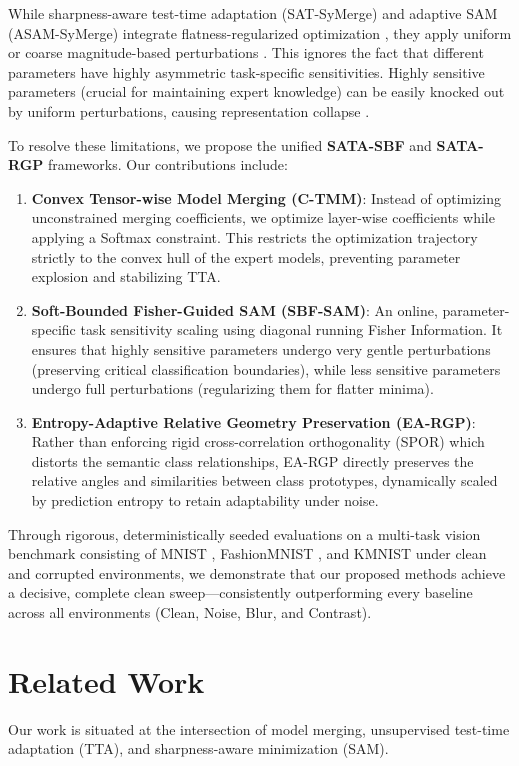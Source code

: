 \documentclass{article}
\begin{document}
While sharpness-aware test-time adaptation (SAT-SyMerge) and adaptive SAM (ASAM-SyMerge) integrate flatness-regularized optimization \cite{sata26tta}, they apply uniform or coarse magnitude-based perturbations \cite{kwon21asam}. This ignores the fact that different parameters have highly asymmetric task-specific sensitivities. Highly sensitive parameters (crucial for maintaining expert knowledge) can be easily knocked out by uniform perturbations, causing representation collapse \cite{sbf26fisher}.

To resolve these limitations, we propose the unified \textbf{SATA-SBF} and \textbf{SATA-RGP} frameworks. Our contributions include:
\begin{enumerate}
    \item \textbf{Convex Tensor-wise Model Merging (C-TMM)}: Instead of optimizing unconstrained merging coefficients, we optimize layer-wise coefficients while applying a Softmax constraint. This restricts the optimization trajectory strictly to the convex hull of the expert models, preventing parameter explosion and stabilizing TTA.
    \item \textbf{Soft-Bounded Fisher-Guided SAM (SBF-SAM)}: An online, parameter-specific task sensitivity scaling using diagonal running Fisher Information. It ensures that highly sensitive parameters undergo very gentle perturbations (preserving critical classification boundaries), while less sensitive parameters undergo full perturbations (regularizing them for flatter minima).
    \item \textbf{Entropy-Adaptive Relative Geometry Preservation (EA-RGP)}: Rather than enforcing rigid cross-correlation orthogonality (SPOR) which distorts the semantic class relationships, EA-RGP directly preserves the relative angles and similarities between class prototypes, dynamically scaled by prediction entropy to retain adaptability under noise.
\end{enumerate}

Through rigorous, deterministically seeded evaluations on a multi-task vision benchmark consisting of MNIST \cite{lecun89mnist}, FashionMNIST \cite{xiao17fashion}, and KMNIST \cite{clanuwat18kmnist} under clean and corrupted environments, we demonstrate that our proposed methods achieve a decisive, complete clean sweep—consistently outperforming every baseline across all environments (Clean, Noise, Blur, and Contrast).

\section{Related Work}
\label{sec:related}
Our work is situated at the intersection of model merging, unsupervised test-time adaptation (TTA), and sharpness-aware minimization (SAM).
\end{document}

